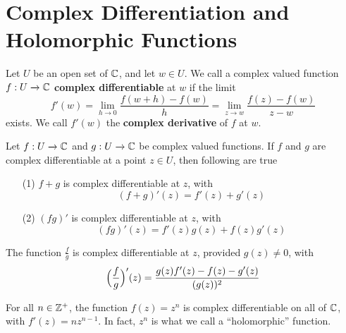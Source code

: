 \section{Complex Differentiation and Holomorphic Functions}

\begin{definition}
    Let $U$ be an open set of $\mathbb{C}$, and let $w \in U$. We call a complex valued
    function  $f:U \xrightarrow{} \mathbb{C}$ \textbf{complex differentiable} at $w$ if
    the limit
    \begin{equation*}
        f'(w)=\lim_{h \xrightarrow{} 0}\frac{f(w+h)-f(w)}{h}=
        \lim_{z \xrightarrow{} w}\frac{f(z)-f(w)}{z-w}
    \end{equation*}
    exists. We call $f'(w)$ the \textbf{complex derivative} of $f$ at $w$.
\end{definition}

\begin{theorem}\label{1.3.1}
    Let $f:U \xrightarrow{} \mathbb{C}$ and $g:U \xrightarrow{} \mathbb{C}$ be complex valued
    functions. If $f$ and $g$ are complex differentiable at a point $z \in U$,
    then following are true
    \begin{enumerate}
        \item[(1)] $f+g$ is complex differentiable at $z$, with
            \begin{equation*}
                (f+g)'(z)=f'(z)+g'(z)
            \end{equation*}

        \item[(2)] $(fg)'$ is complex differentiable at $z$, with
            \begin{equation*}
                (fg)'(z)=f'(z)g(z)+f(z)g'(z)
            \end{equation*}
    \end{enumerate}
\end{theorem}
\begin{corollary}
    The function $\frac{f}{g}$ is complex differentiable at $z$, provided  $g(z)
    \neq 0$, with
    \begin{equation*}
        \Big{(}\frac{f}{g}\Big{)}'(z)=\frac{g(z)f'(z)-f(z)-g'(z)}{(g(z))^2}
    \end{equation*}
\end{corollary}

\begin{example}\label{example_2}
    For all $n \in \mathbb{Z}^+$, the function $f(z)=z^n$ is complex differentiable on
    all of $\mathbb{C}$, with  $f'(z)=nz^{n-1}$. In fact, $z^n$ is what we call a
    ``holomorphic'' function.
\end{example}


